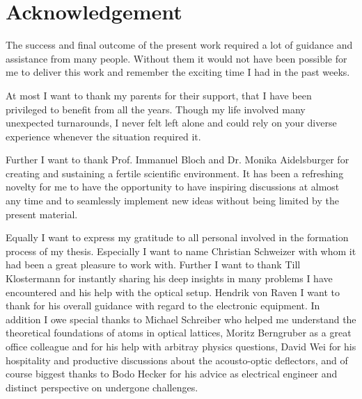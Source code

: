 \chapter*{Acknowledgement}

The success and final outcome of the present work required a lot of guidance
and assistance from many people. Without them it would not have been possible
for me to deliver this work and remember the exciting time I had in the past
weeks.

At most I want to thank my parents for their support, that I have been
privileged to benefit from all the years. Though my life involved many
unexpected turnarounds, I never felt left alone and could rely on your
diverse experience whenever the situation required it.

Further I want to thank Prof. Immanuel Bloch and Dr. Monika Aidelsburger for
creating and sustaining a fertile scientific environment. It has been a
refreshing novelty for me to have the opportunity to have inspiring
discussions at almost any time and to seamlessly implement new ideas without
being limited by the present material.

Equally I want to express my gratitude to all personal involved in the
formation process of my thesis. Especially I want to name Christian Schweizer
with whom it had been a great pleasure to work with. Further I want to thank
Till Klostermann for instantly sharing his deep insights in many problems I
have encountered and his help with the optical setup. Hendrik von Raven I want
to thank for his overall guidance with regard to the electronic equipment.
In addition I owe special thanks to Michael Schreiber who helped me understand
the theoretical foundations of atoms in optical lattices, Moritz Berngruber
as a great office colleague and for his help with arbitray physics questions,
David Wei for his hospitality and productive discussions about the
acousto-optic deflectors, and of course biggest thanks to Bodo Hecker for his
advice as electrical engineer and distinct perspective on undergone challenges.
